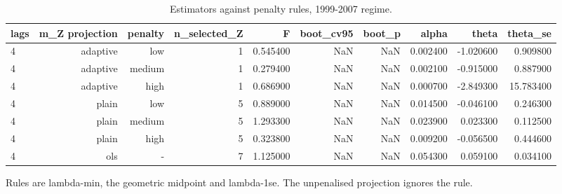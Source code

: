 \begin{table}[htbp]
\centering
\caption{Estimators against penalty rules, 1999-2007 regime.}
\label{tab:tab09_penalty_sweep}
\begin{threeparttable}
\begin{tabular}{lrrrrrrrrr}
\toprule
lags & m\_Z projection & penalty & n\_selected\_Z & F & boot\_cv95 & boot\_p & alpha & theta & theta\_se \\
\midrule
4 & adaptive & low & 1 & 0.545400 & NaN & NaN & 0.002400 & -1.020600 & 0.909800 \\
4 & adaptive & medium & 1 & 0.279400 & NaN & NaN & 0.002100 & -0.915000 & 0.887900 \\
4 & adaptive & high & 1 & 0.686900 & NaN & NaN & 0.000700 & -2.849300 & 15.783400 \\
4 & plain & low & 5 & 0.889000 & NaN & NaN & 0.014500 & -0.046100 & 0.246300 \\
4 & plain & medium & 5 & 1.293300 & NaN & NaN & 0.023900 & 0.023300 & 0.112500 \\
4 & plain & high & 5 & 0.323800 & NaN & NaN & 0.009200 & -0.056500 & 0.444600 \\
4 & ols & - & 7 & 1.125000 & NaN & NaN & 0.054300 & 0.059100 & 0.034100 \\
\bottomrule
\end{tabular}

\begin{tablenotes}[flushleft]\small
\item Rules are lambda-min, the geometric midpoint and lambda-1se. The unpenalised projection ignores the rule.
\end{tablenotes}
\end{threeparttable}
\end{table}